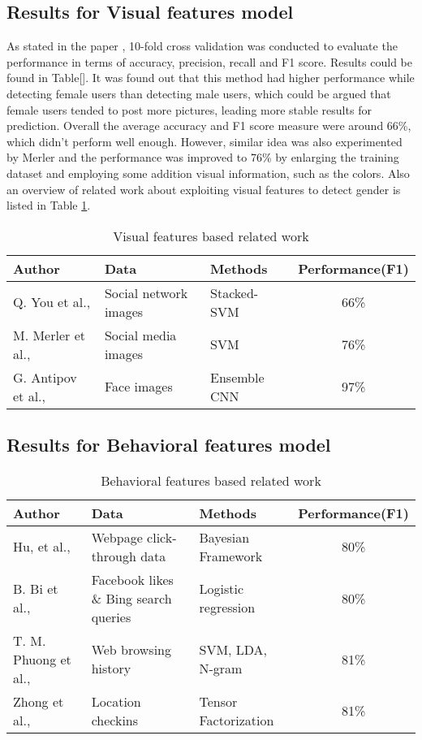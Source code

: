 \documentclass[runningheads]{llncs}
\begin{document}
	\subsection{Results for Visual features model}
	
	As stated in the paper \cite{you2014eyes}, 10-fold cross validation was conducted to evaluate the performance in terms of accuracy, precision, recall and F1 score. Results could be found in Table[]. It was found out that this method had higher performance while detecting female users than detecting male users, which could be argued that female users tended to post more pictures, leading more stable results for prediction. Overall the average accuracy and F1 score measure were around 66\%, which didn’t perform well enough.
	However, similar idea was also experimented by Merler \cite{merler2015you} and the performance was improved to 76\% by enlarging the training dataset and employing some addition visual information, such as the colors. 
	Also an overview of related work about exploiting visual features to detect gender is listed in Table \ref{table:visual_work}. 
	
	\begin{table}
		\caption{Visual features based related work }
		\begin{tabular}{| l | l | l | c | }
			\hline
			Author  &  Data  & Methods & Performance(F1)\\
			\hline
			Q. You et al.,  \cite{you2014eyes} & Social network images & Stacked-SVM & 66\% \\
			M. Merler et al., \cite{merler2015you} & Social media images & SVM & 76\% \\
			G. Antipov et al.,  \cite{antipov2016minimalistic} & Face images & Ensemble CNN
& 97\% \\
			\hline
		\end{tabular}
		\label{table:visual_work}
	\end{table}
	
	\subsection{Results for Behavioral features model}
	
	
	
	\begin{table}
		\caption{Behavioral features based related work }
		\begin{tabular}{| l | l | l | c | }
			\hline
			Author  &  Data  & Methods & Performance(F1)\\
			\hline
			Hu, et al.,  \cite{hu2007demographic} & Webpage click-through data
 & Bayesian Framework
& 80\% \\
			B. Bi et al., \cite{bi2013inferring} & Facebook likes \& Bing search queries & Logistic regression & 80\% \\
			T. M. Phuong et al., \cite{phuong2014gender} & Web browsing history & SVM, LDA, N-gram
 & 81\% \\
			Zhong et al., \cite{zhong2015you} & Location checkins & Tensor Factorization & 81\% \\
			\hline
		\end{tabular}
		\label{table:behavioral_work}
	\end{table}
\end{document}
